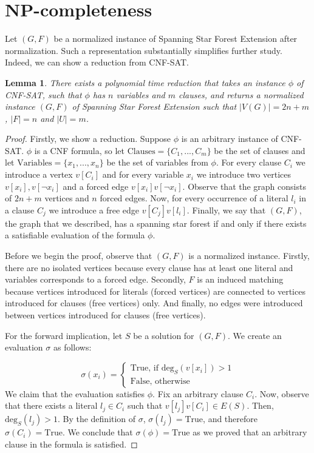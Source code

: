 \documentclass[en]{pracamgr}
\newtheorem{lemma}{Lemma}
\theoremstyle{definition}
\newcommand{\ssfep}{{\sc Spanning Star Forest Extension}}
\newcommand{\cnfsat}{{\sc CNF-SAT}}
\newcommand{\degree}[2]{\textrm{deg}_{#1}(#2)}
\newcommand{\true}{\textrm{True}}
\begin{document}
\section{NP-completeness}

Let $(G,F)$ be a normalized instance of \ssfep{} after normalization. Such a representation substantially simplifies further study. Indeed, we can show a reduction from \cnfsat{}.

\begin{lemma}\label{ssfep reduction}
	There exists a polynomial time reduction that takes an instance $\phi$ of \cnfsat{}, such that $\phi$ has $n$ variables and $m$ clauses, and returns a normalized instance $(G,F)$ of \ssfep{} such that $|V(G)|=2n+m$, $|F|=n$ and $|U|=m$.
\end{lemma}

\begin{proof}
	Firstly, we show a reduction. Suppose $\phi$ is an arbitrary instance of \cnfsat{}. $\phi$ is a CNF formula, so let $\textrm{Clauses}=\{C_1,...,C_m\}$ be the set of clauses and let $\textrm{Variables}=\{x_1,...,x_n\}$ be the set of variables from $\phi$. For every clause $C_i$ we introduce a vertex $v[C_i]$ and for every variable $x_i$ we introduce two vertices $v[x_i],v[\neg x_i]$ and a forced edge $v[x_i]v[\neg x_i]$. Observe that the graph consists of $2n+m$ vertices and $n$ forced edges. Now, for every occurrence of a literal $l_i$ in a clause $C_j$ we introduce a free edge $v[C_j]v[l_i]$. Finally, we say that $(G,F)$, the graph that we described, has a spanning star forest if and only if there exists a satisfiable evaluation of the formula $\phi$.
	
	Before we begin the proof, observe that $(G,F)$ is a normalized instance. Firstly, there are no isolated vertices because every clause has at least one literal and variables corresponds to a forced edge. Secondly, $F$ is an induced matching because vertices introduced for literals (forced vertices) are connected to vertices introduced for clauses (free vertices) only. And finally, no edges were introduced between vertices introduced for clauses (free vertices).
	
	For the forward implication, let $S$ be a solution for $(G,F)$. We create an evaluation $\sigma$ as follows:
	
	\begin{equation*}
		\sigma(x_i) = 
		\begin{cases}
			\textrm{True}\text{, if $\degree{S}{v[x_i]} > 1$} \\
			\textrm{False}\text{, otherwise}
		\end{cases}
	\end{equation*}
	We claim that the evaluation satisfies $\phi$. Fix an arbitrary clause $C_i$. Now, observe that there exists a literal $l_j \in C_i$ such that $v[l_j]v[C_i] \in E(S)$. Then, $\degree{S}{l_j}>1$. By the definition of $\sigma$, $\sigma(l_j)=\true$, and therefore $\sigma(C_i)=\true$. We conclude that $\sigma(\phi)=\true$ as we proved that an arbitrary clause in the formula is satisfied.
	

\end{proof}
\end{document}
